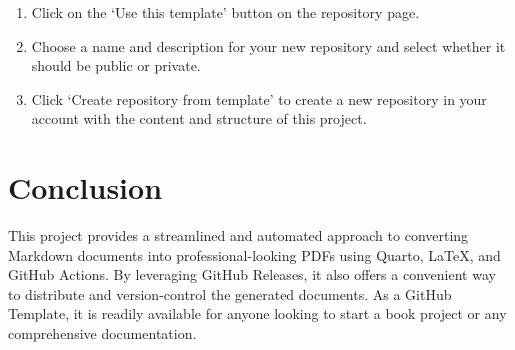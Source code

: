 \documentclass[
  letterpaper,
  paper=6in:9in,
  pagesize=pdftex,
  headinclude=on,
  footinclude=on,
  12pt]{scrbook}
\providecommand{\tightlist}{%
  \setlength{\itemsep}{0pt}\setlength{\parskip}{0pt}}\usepackage{longtable,booktabs,array}
\begin{document}
\begin{enumerate}
\def\labelenumi{\arabic{enumi}.}
\tightlist
\item
  Click on the `Use this template' button on the repository page.
\item
  Choose a name and description for your new repository and select
  whether it should be public or private.
\item
  Click `Create repository from template' to create a new repository in
  your account with the content and structure of this project.
\end{enumerate}


\chapter{Conclusion}\label{conclusion}

This project provides a streamlined and automated approach to converting
Markdown documents into professional-looking PDFs using Quarto, LaTeX,
and GitHub Actions. By leveraging GitHub Releases, it also offers a
convenient way to distribute and version-control the generated
documents. As a GitHub Template, it is readily available for anyone
looking to start a book project or any comprehensive documentation.


\backmatter
\end{document}
